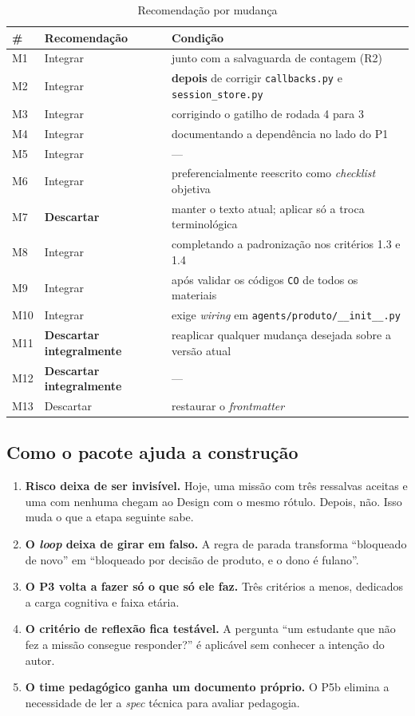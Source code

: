 \documentclass[11pt,a4paper]{article}
\newcommand{\Vermelho}[1]{\textcolor{vermelho}{\textbf{#1}}}
\newcommand{\cod}[1]{\texttt{\small #1}}
\begin{document}
\begin{longtable}{p{0.7cm}p{7.6cm}p{6.4cm}}
\caption{Recomendação por mudança}\\
\toprule
\textbf{\#} & \textbf{Recomendação} & \textbf{Condição} \\
\midrule
\endfirsthead
M1 & Integrar & junto com a salvaguarda de contagem (R2) \\
M2 & Integrar & \textbf{depois} de corrigir \cod{callbacks.py} e \cod{session\_store.py} \\
M3 & Integrar & corrigindo o gatilho de rodada 4 para 3 \\
M4 & Integrar & documentando a dependência no lado do P1 \\
M5 & Integrar & --- \\
M6 & Integrar & preferencialmente reescrito como \textit{checklist} objetiva \\
M7 & \textbf{Descartar} & manter o texto atual; aplicar só a troca terminológica \\
M8 & Integrar & completando a padronização nos critérios 1.3 e 1.4 \\
M9 & Integrar & após validar os códigos \cod{CO} de todos os materiais \\
M10 & Integrar & exige \textit{wiring} em \cod{agents/produto/\_\_init\_\_.py} \\
M11 & \Vermelho{Descartar integralmente} & reaplicar qualquer mudança desejada sobre a versão atual \\
M12 & \Vermelho{Descartar integralmente} & --- \\
M13 & Descartar & restaurar o \textit{frontmatter} \\
\bottomrule
\end{longtable}

\subsection{Como o pacote ajuda a construção}

\begin{enumerate}[leftmargin=*,itemsep=2pt]
  \item \textbf{Risco deixa de ser invisível.} Hoje, uma missão com três ressalvas aceitas e uma com nenhuma
  chegam ao Design com o mesmo rótulo. Depois, não. Isso muda o que a etapa seguinte sabe.
  \item \textbf{O \textit{loop} deixa de girar em falso.} A regra de parada transforma ``bloqueado de novo''
  em ``bloqueado por decisão de produto, e o dono é fulano''.
  \item \textbf{O P3 volta a fazer só o que só ele faz.} Três critérios a menos, dedicados a carga cognitiva
  e faixa etária.
  \item \textbf{O critério de reflexão fica testável.} A pergunta ``um estudante que não fez a missão
  consegue responder?'' é aplicável sem conhecer a intenção do autor.
  \item \textbf{O time pedagógico ganha um documento próprio.} O P5b elimina a necessidade de ler a
  \textit{spec} técnica para avaliar pedagogia.
\end{enumerate}
\end{document}

